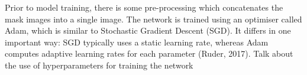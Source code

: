 \documentclass[a4paper]{article}
\begin{document}
\begin{figure}[h]
\begin{minipage}{0.45\textwidth}
\centering
{}
\end{minipage}
\hspace{1cm}
\begin{minipage}{0.45\textwidth}
\centering
{}
\end{minipage}
\end{figure}

Prior to model training, there is some pre-processing which concatenates the mask images into a single image. The network is trained using an optimiser called Adam, which is similar to Stochastic Gradient Descent (SGD). It differs in one important way: SGD typically uses a static learning rate, whereas Adam computes adaptive learning rates for each parameter (Ruder, 2017). Talk about the use of hyperparameters for training the network

\newpage
\end{document}
